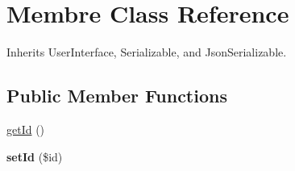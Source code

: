 \hypertarget{class_site_1_1_trail_bundle_1_1_entity_1_1_membre}{}\section{Membre Class Reference}
\label{class_site_1_1_trail_bundle_1_1_entity_1_1_membre}


Inherits User\+Interface, Serializable, and Json\+Serializable.

\subsection*{Public Member Functions}
\begin{DoxyCompactItemize}
\item 
\hyperlink{class_site_1_1_trail_bundle_1_1_entity_1_1_membre_a12251d0c022e9e21c137a105ff683f13}{get\+Id} ()
\item 
\hypertarget{class_site_1_1_trail_bundle_1_1_entity_1_1_membre_a87313ad678fb2a2a8efb435cf0bdb9a0}{}{\bfseries set\+Id} (\$id)\label{class_site_1_1_trail_bundle_1_1_entity_1_1_membre_a87313ad678fb2a2a8efb435cf0bdb9a0}


\end{DoxyCompactItemize}
